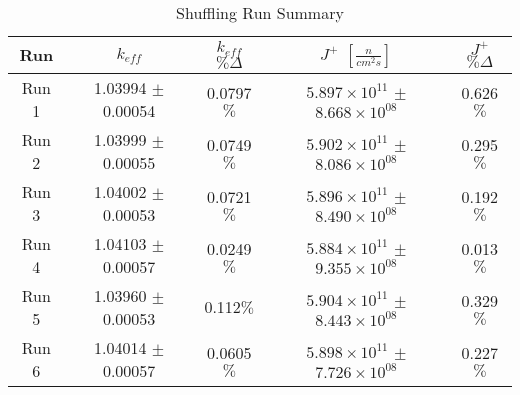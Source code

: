 

\begin{table}[H]
\centering
 \begin{tabularx}{0.7\textwidth}{c  c  c  c  c}
 	\hline
 	Run & $k_{eff}$ & $k_{eff}$ $\% \Delta$ & $J^+$  $[\frac{n}{cm^2s}]$ & $J^+$ $\% \Delta$ \\
 	\hline
 	Run 1 & 1.03994 $\pm$ 0.00054 & 0.0797$\%$ & $5.897\times10^{11}$ $\pm$ $8.668\times10^{08}$ & 0.626$\%$ \\
 	Run 2 & 1.03999 $\pm$ 0.00055 & 0.0749$\%$ & $5.902\times10^{11}$ $\pm$ $8.086\times10^{08}$  & 0.295$\%$ \\
 	Run 3 & 1.04002 $\pm$ 0.00053 & 0.0721$\%$ & $5.896\times10^{11}$ $\pm$ $8.490\times10^{08}$ & 0.192$\%$  \\
 	Run 4 & 1.04103 $\pm$ 0.00057 & 0.0249$\%$ & $5.884\times10^{11}$ $\pm$ $9.355\times10^{08}$ & 0.013$\%$ \\
 	Run 5 & 1.03960 $\pm$ 0.00053 & 0.112$\%$ & $5.904\times10^{11}$ $\pm$ $8.443\times10^{08}$ & 0.329$\%$  \\
 	Run 6 & 1.04014 $\pm$ 0.00057 & 0.0605$\%$ & $5.898\times10^{11}$ $\pm$ $7.726\times10^{08}$ & 0.227$\%$ \\
 	\hline

 \end{tabularx}
\caption{Shuffling Run Summary}
\label{table:shufsens}
\end{table}